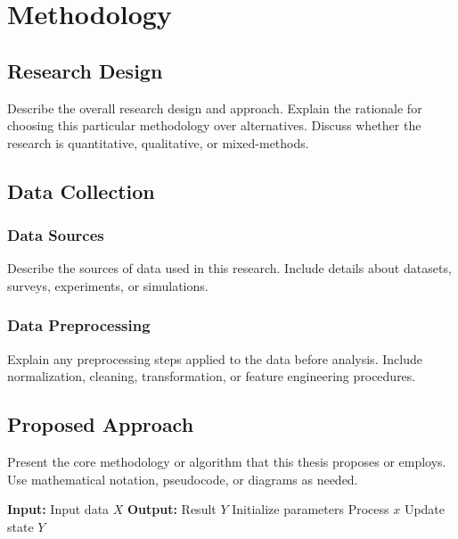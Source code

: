 \chapter{Methodology}
\label{ch:methodology}

\section{Research Design}
\label{sec:research-design}

Describe the overall research design and approach. Explain the rationale
for choosing this particular methodology over alternatives. Discuss
whether the research is quantitative, qualitative, or mixed-methods.

\section{Data Collection}
\label{sec:data-collection}

\subsection{Data Sources}
\label{sec:data-sources}

Describe the sources of data used in this research. Include details about
datasets, surveys, experiments, or simulations.

\subsection{Data Preprocessing}
\label{sec:data-preprocessing}

Explain any preprocessing steps applied to the data before analysis.
Include normalization, cleaning, transformation, or feature engineering
procedures.

\section{Proposed Approach}
\label{sec:proposed-approach}

Present the core methodology or algorithm that this thesis proposes or
employs. Use mathematical notation, pseudocode, or diagrams as needed.

\begin{algorithm}[htbp]
\caption{Algorithm description}
\label{alg:main}
\begin{algorithmic}[1]
    \State \textbf{Input:} Input data $X$
    \State \textbf{Output:} Result $Y$
    \State Initialize parameters
        \State Process $x$
        \State Update state
    \EndFor
    \State \Return $Y$
\end{algorithmic}
\end{algorithm}

